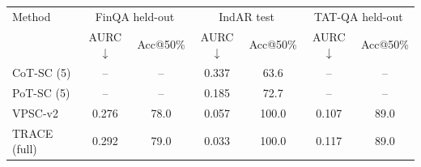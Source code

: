 \begin{tabular}{lcccccc}
\toprule
Method & \multicolumn{2}{c}{FinQA held-out} & \multicolumn{2}{c}{IndAR test} & \multicolumn{2}{c}{TAT-QA held-out} \\
 & AURC$\downarrow$ & Acc@50\% & AURC$\downarrow$ & Acc@50\% & AURC$\downarrow$ & Acc@50\% \\
\midrule
CoT-SC (5) & -- & -- & 0.337 & 63.6 & -- & -- \\
PoT-SC (5) & -- & -- & 0.185 & 72.7 & -- & -- \\
VPSC-v2 & 0.276 & 78.0 & 0.057 & 100.0 & 0.107 & 89.0 \\
TRACE (full) & 0.292 & 79.0 & 0.033 & 100.0 & 0.117 & 89.0 \\
\bottomrule
\end{tabular}
